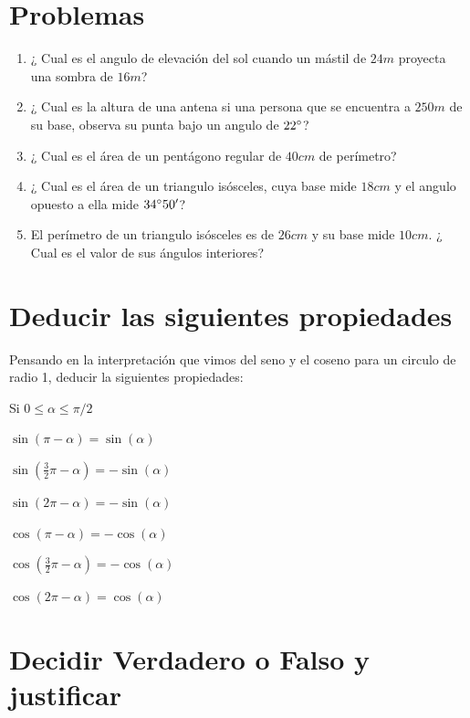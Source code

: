 \documentclass[a4paper,11pt,spanish,sans]{exam}
\begin{document}
\section{Problemas}

\begin{enumerate}

	\item ¿ Cual es el angulo de elevación del sol cuando un mástil de $24m$ proyecta una sombra de $16m$?
	\item ¿ Cual es la altura de una antena si una persona que se encuentra a $250m$ de su base, observa su punta bajo un angulo de $22\degree$?
	\item ¿ Cual es el área de un pentágono regular de $40cm$ de perímetro?
	\item ¿ Cual es el área de un triangulo isósceles, cuya base mide $18cm$ y el angulo opuesto a ella mide $34\degree 50'$?
	\item El perímetro de un triangulo isósceles es de $26cm$ y su base mide $10cm$. ¿ Cual es el valor de sus ángulos interiores?

\end{enumerate} 

\section{Deducir las siguientes propiedades}
Pensando en la interpretación que vimos del seno y el coseno para un circulo de radio 1, deducir la siguientes propiedades:

Si $0\leq \alpha \leq \pi/2$

\begin{enumerate}
\begin{multicols}{2}
	\item $\sin(\pi - \alpha)=\sin(\alpha)$
	\item \bigstar $\sin(\frac{3}{2}\pi - \alpha)=-\sin(\alpha)$
	\item $\sin(2\pi - \alpha)=-\sin(\alpha)$
\columnbreak
	\item $\cos(\pi - \alpha)=-\cos(\alpha)$
	\item \bigstar $\cos(\frac{3}{2}\pi - \alpha)=-\cos(\alpha)$
	\item $\cos(2\pi - \alpha)=\cos(\alpha)$
\end{multicols}
\end{enumerate}

\section{Decidir Verdadero o Falso y justificar}
\end{document}
